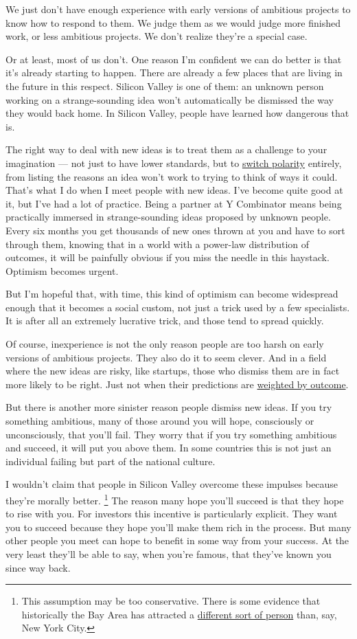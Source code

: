 \documentclass[12pt]{book}
\begin{document}
We just don't have enough experience with early versions of ambitious
projects to know how to respond to them. We judge them as we would judge
more finished work, or less ambitious projects. We don't realize they're
a special case.

Or at least, most of us don't. One reason I'm confident we can do better
is that it's already starting to happen. There are already a few places
that are living in the future in this respect. Silicon Valley is one of
them: an unknown person working on a strange-sounding idea won't
automatically be dismissed the way they would back home. In Silicon
Valley, people have learned how dangerous that is.

The right way to deal with new ideas is to treat them as a challenge to
your imagination --- not just to have lower standards, but to
\href{altair.html}{switch polarity} entirely, from listing the reasons
an idea won't work to trying to think of ways it could. That's what I do
when I meet people with new ideas. I've become quite good at it, but
I've had a lot of practice. Being a partner at Y Combinator means being
practically immersed in strange-sounding ideas proposed by unknown
people. Every six months you get thousands of new ones thrown at you and
have to sort through them, knowing that in a world with a power-law
distribution of outcomes, it will be painfully obvious if you miss the
needle in this haystack. Optimism becomes urgent.

But I'm hopeful that, with time, this kind of optimism can become
widespread enough that it becomes a social custom, not just a trick used
by a few specialists. It is after all an extremely lucrative trick, and
those tend to spread quickly.

Of course, inexperience is not the only reason people are too harsh on
early versions of ambitious projects. They also do it to seem clever.
And in a field where the new ideas are risky, like startups, those who
dismiss them are in fact more likely to be right. Just not when their
predictions are \href{swan.html}{weighted by outcome}.

But there is another more sinister reason people dismiss new ideas. If
you try something ambitious, many of those around you will hope,
consciously or unconsciously, that you'll fail. They worry that if you
try something ambitious and succeed, it will put you above them. In some
countries this is not just an individual failing but part of the
national culture.

I wouldn't claim that people in Silicon Valley overcome these impulses
because they're morally better. \footnote{This assumption may be too conservative. There is some evidence
that historically the Bay Area has attracted a
\href{cities.html}{different sort of person} than, say, New York City.} The reason many
hope you'll succeed is that they hope to rise with you. For investors
this incentive is particularly explicit. They want you to succeed
because they hope you'll make them rich in the process. But many other
people you meet can hope to benefit in some way from your success. At
the very least they'll be able to say, when you're famous, that they've
known you since way back.
\end{document}
